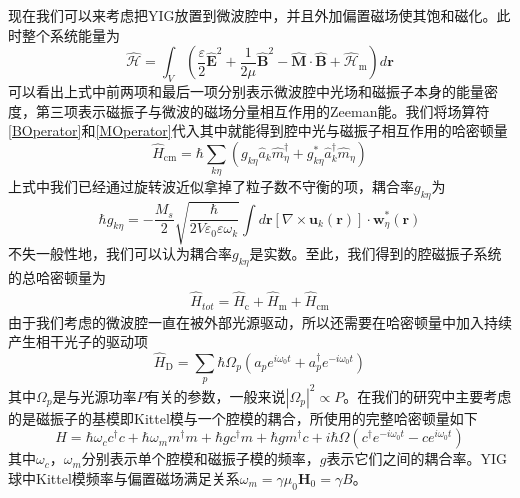 现在我们可以来考虑把YIG放置到微波腔中，并且外加偏置磁场使其饱和磁化。此时整个系统能量为
\begin{equation}
\hat{\mathcal{H}}=\int_V \left(\frac{\varepsilon}{2} \hat{\mathbf{E}}^{2}+\frac{1}{2 \mu} \hat{\mathbf{B}}^{2}-\hat{\mathbf{M}} \cdot \hat{\mathbf{B}}+\hat{\mathcal{H}}_{\mathrm{m}}\right) d \mathbf{r}
\end{equation}
可以看出上式中前两项和最后一项分别表示微波腔中光场和磁振子本身的能量密度，第三项表示磁振子与微波的磁场分量相互作用的Zeeman能。我们将场算符\eqref{BOperator}和\eqref{MOperator}代入其中就能得到腔中光与磁振子相互作用的哈密顿量
\begin{equation}
\hat{H}_{\mathrm{cm}}=\hbar \sum_{k \eta}\left(g_{k \eta} \hat{a}_{k} \hat{m}_{\eta}^{\dagger}+g_{k \eta}^{*} \hat{a}_{k}^{\dagger} \hat{m}_{\eta}\right)
\end{equation}
上式中我们已经通过旋转波近似拿掉了粒子数不守衡的项，耦合率$g_{k \eta}$为
\begin{equation}
\hbar g_{k \eta}=-\frac{M_{s}}{2} \sqrt{\frac{\hbar}{2 V \varepsilon_{0} \varepsilon \omega_{k}}} \int d \mathbf{r}\left[\nabla \times \mathbf{u}_{k}(\mathbf{r})\right] \cdot \mathbf{w}_{\eta}^{*}(\mathbf{r})
\end{equation}
不失一般性地，我们可以认为耦合率$g_{k \eta}$是实数。至此，我们得到的腔磁振子系统的总哈密顿量为
\begin{equation}
\begin{aligned}
\hat{H}_{tot}=\hat{H}_{\mathrm{c}}+\hat{H}_{\mathrm{m}}+\hat{H}_{\mathrm{cm}}
\end{aligned}
\end{equation}
由于我们考虑的微波腔一直在被外部光源驱动，所以还需要在哈密顿量中加入持续产生相干光子的驱动项
\begin{equation}
\hat{H}_{\mathrm{D}}=\sum_{p} \hbar \Omega_{p}\left({a}_{p} e^{i \omega_{\mathrm{0}} t}+{a}_{p}^{\dagger} e^{-i \omega_{\mathrm{0}} t}\right)
\end{equation}
其中$\Omega_{p}$是与光源功率$P$有关的参数，一般来说$|\Omega_{p}|^2 \propto P$。在我们的研究中主要考虑的是磁振子的基模即Kittel模与一个腔模的耦合，所使用的完整哈密顿量如下
\begin{equation}
H = \hbar\omega_{c}c^{\dag}c+\hbar\omega_{m}m^{\dag}m+\hbar gc^{\dag}m+\hbar gm^{\dag}c+i\hbar\Omega(c^{\dag}e^{-i\omega_{0}t}-ce^{i\omega_{0}t})
\label{Hamiltonian}
\end{equation}
其中$\omega_{c}$，$\omega_{m}$分别表示单个腔模和磁振子模的频率，$g$表示它们之间的耦合率。YIG球中Kittel模频率与偏置磁场满足关系$\omega_{m}=\gamma\mu_{0} \mathbf{H}_{0}=\gamma B$。

